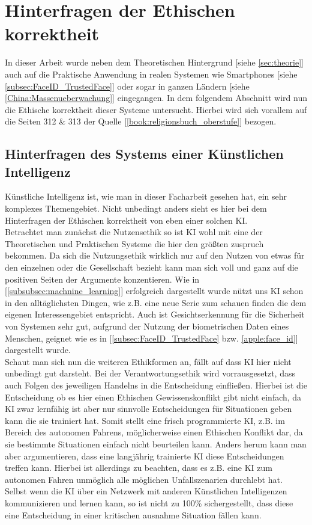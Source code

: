 \section{Hinterfragen der Ethischen korrektheit}
    In dieser Arbeit wurde neben dem Theoretischen Hintergrund [siehe \ref{sec:theorie}] auch auf die Praktische Anwendung in realen Systemen wie Smartphones [siehe \ref{subsec:FaceID_TrustedFace}] oder sogar in ganzen Ländern [siehe \ref{China:Massenueberwachung}] eingegangen. In dem folgendem Abschnitt wird nun die Ethische korrektheit dieser Systeme untersucht. Hierbei wird sich vorallem auf die Seiten 312 & 313 der Quelle [\ref{book:religionsbuch_oberstufe}] bezogen.

    \subsection{Hinterfragen des Systems einer Künstlichen Intelligenz}
    \label{subsec:ethik_ki}
        Künstliche Intelligenz ist, wie man in dieser Facharbeit gesehen hat, ein sehr komplexes Themengebiet. Nicht unbedingt anders sieht es hier bei dem Hinterfragen der Ethischen korrektheit von eben einer solchen KI.\\

        Betrachtet man zunächst die Nutzensethik so ist KI wohl mit eine der Theoretischen und Praktischen Systeme die hier den größten zuspruch bekommen. Da sich die Nutzungsethik wirklich nur auf den Nutzen von etwas für den einzelnen oder die Gesellschaft bezieht kann man sich voll und ganz auf die positiven Seiten der Argumente konzentieren. Wie in [\ref{subsubsec:machnine_learning}] erfolgreich dargestellt wurde nützt uns KI schon in den alltäglichsten Dingen, wie z.B. eine neue Serie zum schauen finden die dem eigenen Interessengebiet entspricht. Auch ist Gesichtserkennung für die Sicherheit von Systemen sehr gut, aufgrund der Nutzung der biometrischen Daten eines Menschen, geignet wie es in [\ref{subsec:FaceID_TrustedFace} bzw. \ref{apple:face_id}] dargestellt wurde.\\

        Schaut man sich nun die weiteren Ethikformen an, fällt auf dass KI hier nicht unbedingt gut darsteht. Bei der Verantwortungsethik wird vorrausgesetzt, dass auch Folgen des jeweiligen Handelns in die Entscheidung einfließen. Hierbei ist die Entscheidung ob es hier einen Ethischen Gewissenskonflikt gibt nicht einfach, da KI zwar lernfähig ist aber nur sinnvolle Entscheidungen für Situationen geben kann die sie trainiert hat. Somit stellt eine frisch programmierte KI, z.B. im Bereich des autonomen Fahrens, möglicherweise einen Ethischen Konflikt dar, da sie bestimmte Situationen einfach nicht beurteilen kann. Anders herum kann man aber argumentieren, dass eine langjährig trainierte KI diese Entscheidungen treffen kann. Hierbei ist allerdings zu beachten, dass es z.B. eine KI zum autonomen Fahren unmöglich alle möglichen Unfallszenarien durchlebt hat. Selbst wenn die KI über ein Netzwerk mit anderen Künstlichen Intelligenzen kommunizieren und lernen kann, so ist nicht zu 100\% sichergestellt, dass diese eine Entscheidung in einer kritischen ausnahme Situation fällen kann. 
        
